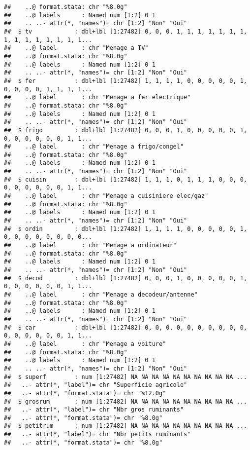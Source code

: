 \documentclass[
]{article}
\begin{document}
\begin{verbatim}
##    ..@ format.stata: chr "%8.0g"
##    ..@ labels      : Named num [1:2] 0 1
##    .. ..- attr(*, "names")= chr [1:2] "Non" "Oui"
##  $ tv            : dbl+lbl [1:27482] 0, 0, 0, 1, 1, 1, 1, 1, 1, 1, 1, 1, 1, 1, 1, 1, 1, 1...
##    ..@ label       : chr "Menage a TV"
##    ..@ format.stata: chr "%8.0g"
##    ..@ labels      : Named num [1:2] 0 1
##    .. ..- attr(*, "names")= chr [1:2] "Non" "Oui"
##  $ fer           : dbl+lbl [1:27482] 1, 1, 1, 1, 0, 0, 0, 0, 0, 1, 0, 0, 0, 0, 1, 1, 1, 1...
##    ..@ label       : chr "Menage a fer electrique"
##    ..@ format.stata: chr "%8.0g"
##    ..@ labels      : Named num [1:2] 0 1
##    .. ..- attr(*, "names")= chr [1:2] "Non" "Oui"
##  $ frigo         : dbl+lbl [1:27482] 0, 0, 0, 1, 0, 0, 0, 0, 0, 1, 0, 0, 0, 0, 0, 0, 1, 1...
##    ..@ label       : chr "Menage a frigo/congel"
##    ..@ format.stata: chr "%8.0g"
##    ..@ labels      : Named num [1:2] 0 1
##    .. ..- attr(*, "names")= chr [1:2] "Non" "Oui"
##  $ cuisin        : dbl+lbl [1:27482] 1, 1, 1, 0, 1, 1, 1, 0, 0, 0, 0, 0, 0, 0, 0, 0, 1, 1...
##    ..@ label       : chr "Menage a cuisiniere elec/gaz"
##    ..@ format.stata: chr "%8.0g"
##    ..@ labels      : Named num [1:2] 0 1
##    .. ..- attr(*, "names")= chr [1:2] "Non" "Oui"
##  $ ordin         : dbl+lbl [1:27482] 1, 1, 1, 1, 0, 0, 0, 0, 0, 1, 0, 0, 0, 0, 0, 0, 0, 0...
##    ..@ label       : chr "Menage a ordinateur"
##    ..@ format.stata: chr "%8.0g"
##    ..@ labels      : Named num [1:2] 0 1
##    .. ..- attr(*, "names")= chr [1:2] "Non" "Oui"
##  $ decod         : dbl+lbl [1:27482] 0, 0, 0, 1, 0, 0, 0, 0, 0, 1, 0, 0, 0, 0, 0, 0, 1, 1...
##    ..@ label       : chr "Menage a decodeur/antenne"
##    ..@ format.stata: chr "%8.0g"
##    ..@ labels      : Named num [1:2] 0 1
##    .. ..- attr(*, "names")= chr [1:2] "Non" "Oui"
##  $ car           : dbl+lbl [1:27482] 0, 0, 0, 0, 0, 0, 0, 0, 0, 0, 0, 0, 0, 0, 0, 0, 1, 1...
##    ..@ label       : chr "Menage a voiture"
##    ..@ format.stata: chr "%8.0g"
##    ..@ labels      : Named num [1:2] 0 1
##    .. ..- attr(*, "names")= chr [1:2] "Non" "Oui"
##  $ superf        : num [1:27482] NA NA NA NA NA NA NA NA NA NA ...
##   ..- attr(*, "label")= chr "Superficie agricole"
##   ..- attr(*, "format.stata")= chr "%12.0g"
##  $ grosrum       : num [1:27482] NA NA NA NA NA NA NA NA NA NA ...
##   ..- attr(*, "label")= chr "Nbr gros ruminants"
##   ..- attr(*, "format.stata")= chr "%8.0g"
##  $ petitrum      : num [1:27482] NA NA NA NA NA NA NA NA NA NA ...
##   ..- attr(*, "label")= chr "Nbr petits ruminants"
##   ..- attr(*, "format.stata")= chr "%8.0g"

\end{verbatim}
\end{document}
